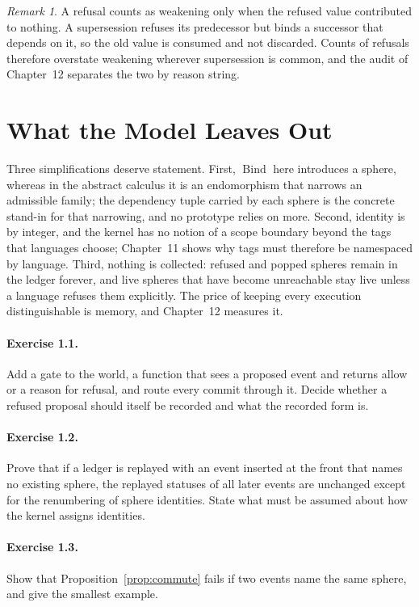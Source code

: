 \documentclass[11pt,oneside]{report}
\newcommand{\Bind}{\operatorname{Bind}}
\theoremstyle{plain}
\theoremstyle{definition}
\theoremstyle{remark}
\newtheorem{remark}[proposition]{Remark}
\begin{document}
\begin{remark}
A refusal counts as weakening only when the refused value contributed to nothing. A supersession refuses its predecessor but binds a successor that depends on it, so the old value is consumed and not discarded. Counts of refusals therefore overstate weakening wherever supersession is common, and the audit of Chapter~12 separates the two by reason string.
\end{remark}

\section{What the Model Leaves Out}

Three simplifications deserve statement. First, $\Bind$ here introduces a sphere, whereas in the abstract calculus it is an endomorphism that narrows an admissible family; the dependency tuple carried by each sphere is the concrete stand-in for that narrowing, and no prototype relies on more. Second, identity is by integer, and the kernel has no notion of a scope boundary beyond the tags that languages choose; Chapter~11 shows why tags must therefore be namespaced by language. Third, nothing is collected: refused and popped spheres remain in the ledger forever, and live spheres that have become unreachable stay live unless a language refuses them explicitly. The price of keeping every execution distinguishable is memory, and Chapter~12 measures it.

\paragraph{Exercise 1.1.} Add a gate to the world, a function that sees a proposed event and returns allow or a reason for refusal, and route every commit through it. Decide whether a refused proposal should itself be recorded and what the recorded form is.

\paragraph{Exercise 1.2.} Prove that if a ledger is replayed with an event inserted at the front that names no existing sphere, the replayed statuses of all later events are unchanged except for the renumbering of sphere identities. State what must be assumed about how the kernel assigns identities.

\paragraph{Exercise 1.3.} Show that Proposition~\ref{prop:commute} fails if two events name the same sphere, and give the smallest example.
\end{document}
